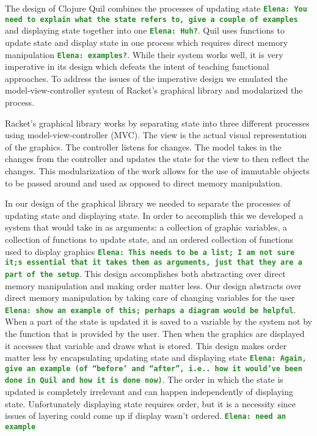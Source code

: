 \documentclass[12pt]{article}
\newcommand{\comment}[1]{{\bf \tt  {#1}}}
\newcommand{\emcomment}[1]{\textcolor{ForestGreen}{\comment{Elena: {#1}}}}
\begin{document}
The design of Clojure Quil combines the processes of updating state \emcomment{You need to explain what the state refers to, give a couple of examples} and displaying state together into one \emcomment{Huh?}. Quil uses functions to update state and display state in one process which requires direct memory manipulation \emcomment{examples?}. While their system works well, it is very imperative in its design which defeats the intent of teaching functional approaches. To address the issues of the imperative design we emulated the model-view-controller system of Racket's graphical library and modularized the process.

Racket's graphical library works by separating state into three different processes using model-view-controller (MVC). The view is the actual visual representation of the graphics. The controller listens for changes. The model takes in the changes from the controller and updates the state for the view to then reflect the changes. This modularization of the work allows for the use of immutable objects to be passed around and used as opposed to direct memory manipulation.

In our design of the graphical library we needed to separate the processes of updating state and displaying state. In order to accomplish this we developed a system that would take in as arguments: a collection of graphic variables, a collection of functions to update state, and an ordered collection of functions used to display graphics \emcomment{This needs to be a list; I am not sure it;s essential that it takes them as arguments, just that they are a part of the setup}.  This design accomplishes both abstracting over direct memory manipulation and making order matter less. Our design abstracts over direct memory manipulation by taking care of changing variables for the user \emcomment{show an example of this; perhaps a diagram would be helpful}. When a part of the state is updated it is saved to a variable by the system not by the function that is provided by the user. Then when the graphics are displayed it accesses that variable and draws what is stored. This design makes order matter less by encapsulating updating state and displaying state \emcomment{Again, give an example (of ``before' and ``after'', i.e.. how it would've been done in Quil and how it is done now)}. The order in which the state is updated is completely irrelevant and can happen independently of displaying state. Unfortunately displaying state requires order, but it is a necessity since issues of layering could come up if display wasn't ordered.
\emcomment{need an example}
\end{document}
